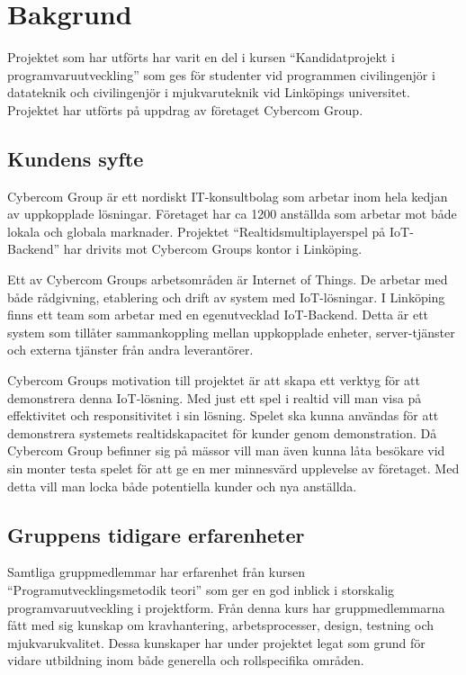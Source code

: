 \chapter{Bakgrund}
\label{cha:background}
Projektet som har utförts har varit en del i kursen ``Kandidatprojekt i programvaruutveckling'' som ges för studenter vid programmen civilingenjör i datateknik och civilingenjör i mjukvaruteknik vid Linköpings universitet.\cite{tddd96} Projektet har utförts på uppdrag av företaget Cybercom Group.

\section{Kundens syfte}
\label{sec:customer-aim}
Cybercom Group är ett nordiskt IT-konsultbolag som arbetar inom hela kedjan av uppkopplade lösningar. Företaget har ca 1200 anställda som arbetar mot både lokala och globala marknader.\cite{cybercomgroup} Projektet ``Realtidsmultiplayerspel på IoT-Backend'' har drivits mot Cybercom Groups kontor i Linköping.

Ett av Cybercom Groups arbetsområden är Internet of Things. De arbetar med både rådgivning, etablering och drift av system med IoT-lösningar.\cite{cybercomiot} I Linköping finns ett team som arbetar med en egenutvecklad IoT-Backend. Detta är ett system som tillåter sammankoppling mellan uppkopplade enheter, server-tjänster och externa tjänster från andra leverantörer.

Cybercom Groups motivation till projektet är att skapa ett verktyg för att demonstrera denna IoT-lösning. Med just ett spel i realtid vill man visa på effektivitet och responsitivitet i sin lösning. Spelet ska kunna användas för att demonstrera systemets realtidskapacitet för kunder genom demonstration. Då Cybercom Group befinner sig på mässor vill man även kunna låta besökare vid sin monter testa spelet för att ge en mer minnesvärd upplevelse av företaget. Med detta vill man locka både potentiella kunder och nya anställda.

\section{Gruppens tidigare erfarenheter}
\label{sec:earlier-experience}
Samtliga gruppmedlemmar har erfarenhet från kursen ``Programutvecklingsmetodik teori'' som ger en god inblick i storskalig programvaruutveckling i projektform. Från denna kurs har gruppmedlemmarna fått med sig kunskap om kravhantering, arbetsprocesser, design, testning och mjukvarukvalitet.\cite{tddc93} Dessa kunskaper har under projektet legat som grund för vidare utbildning inom både generella och rollspecifika områden.

